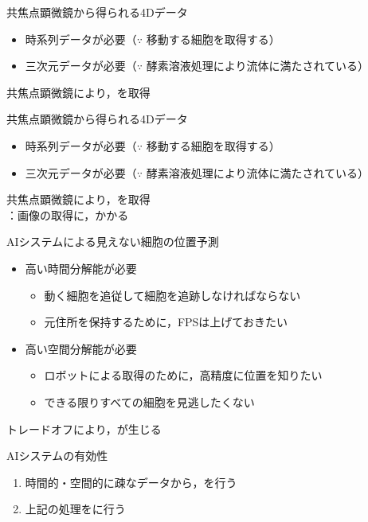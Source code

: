 \begin{frame}{共焦点顕微鏡から得られる4Dデータ}
    \begin{itemize}
        \item 時系列データが必要（$\because$ 移動する細胞を取得する）
        \item 三次元データが必要（$\because$ 酵素溶液処理により流体に満たされている）
    \end{itemize}
    \ra 共焦点顕微鏡\cite{paddock2000principles}により，を取得
    \\
\end{frame}
\begin{frame}[noframenumbering]{共焦点顕微鏡から得られる4Dデータ}
    \begin{itemize}
        \item 時系列データが必要（$\because$ 移動する細胞を取得する）
        \item 三次元データが必要（$\because$ 酵素溶液処理により流体に満たされている）
    \end{itemize}
    \ra 共焦点顕微鏡\cite{paddock2000principles}により，を取得
    \\\ra {}：画像の取得に，かかる
\end{frame}

\begin{frame}{AIシステムによる見えない細胞の位置予測}
    \begin{itemize}
        \item 高い時間分解能が必要
        \begin{itemize}
            \item 動く細胞を追従して細胞を追跡しなければならない
            \item 元住所を保持するために，FPSは上げておきたい
        \end{itemize}
        \vs
        \item 高い空間分解能が必要
        \begin{itemize}
            \item ロボットによる取得のために，高精度に位置を知りたい
            \item できる限りすべての細胞を見逃したくない
        \end{itemize}
    \end{itemize}
    \Ra トレードオフにより，が生じる
    \vs
    \begin{block}{AIシステムの有効性}
        \begin{enumerate}
            \item 時間的・空間的に疎なデータから，を行う
            \item 上記の処理をに行う
        \end{enumerate}
    \end{block}
\end{frame}